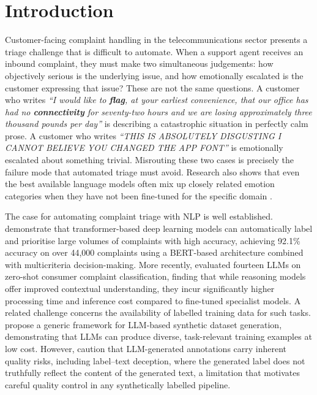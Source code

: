 \documentclass[11pt]{article}
\begin{document}
\section{Introduction}

Customer-facing complaint handling in the telecommunications sector presents a
triage challenge that is difficult to automate. When a support agent receives an
inbound complaint, they must make two simultaneous judgements: how objectively serious
is the underlying issue, and how emotionally escalated is the customer expressing that
issue? These are not the same questions. A customer who writes \textit{``I would like
to \textbf{flag}, at your earliest convenience, that our office has had no
\textbf{connectivity} for seventy-two hours and we are losing approximately three
thousand pounds per day''} is describing a catastrophic situation in perfectly calm
prose. A customer who writes \textit{``THIS IS ABSOLUTELY DISGUSTING I CANNOT BELIEVE
YOU CHANGED THE APP FONT''} is emotionally escalated about something trivial.
Misrouting these two cases is precisely the failure mode that automated triage must
avoid. Research also shows that even the best available language models often mix up
closely related emotion categories when they have not been fine-tuned for the specific
domain \citep{zhang2024sentiment}.

The case for automating complaint triage with NLP is well established.
\citet{vairetti2024} demonstrate that transformer-based deep learning models can
automatically label and prioritise large volumes of complaints with high accuracy,
achieving 92.1\% accuracy on over 44,000 complaints using a BERT-based architecture
combined with multicriteria decision-making. More recently, \citet{roumeliotis2025}
evaluated fourteen LLMs on zero-shot consumer complaint classification, finding that
while reasoning models offer improved contextual understanding, they incur
significantly higher processing time and inference cost compared to fine-tuned
specialist models. A related challenge concerns the availability of labelled training data for such tasks.
\citet{long2024llms} propose a generic framework for LLM-based
synthetic dataset generation, demonstrating that LLMs can produce diverse,
task-relevant training examples at low cost. However, \citet{tan2024annotation} caution
that LLM-generated annotations carry inherent quality risks, including label--text
deception, where the generated label does not truthfully reflect the content of the
generated text, a limitation that motivates careful quality control in any synthetically
labelled pipeline.
\end{document}
